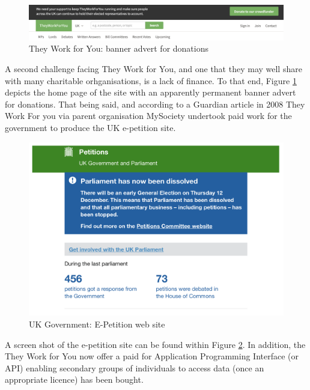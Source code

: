 \begin{figure}[h]
  \includegraphics[scale=0.3]{images/they-work-for-you-challenges-finance}
  \caption{They Work for You: banner advert for donations}
  \label{fig:they-work-for-you-challenges-finance}
\end{figure}

A second challenge facing They Work for You, and one that they may well share with many charitable orhganisations, is a lack of finance.
To that end, Figure \ref{fig:they-work-for-you-challenges-finance} depicts the home page of the site with an apparently permanent banner advert for donations.
That being said, and according to a Guardian article in 2008 \cite{guardian-tom-steinberg} They Work For you via parent organisation MySociety undertook paid work for the government to produce the UK e-petition site.

\begin{figure}[h]
  \centering
  \includegraphics[scale=0.3]{images/e-petition-site}
  \caption{UK Government: E-Petition web site}
  \label{fig:e-petition-site}
\end{figure}

A screen shot of the e-petition site can be found within Figure \ref{fig:e-petition-site}.
In addition, the They Work for You now offer a paid for Application Programming Interface (or API) enabling secondary groups of individuals to access data (once an appropriate licence) has been bought.